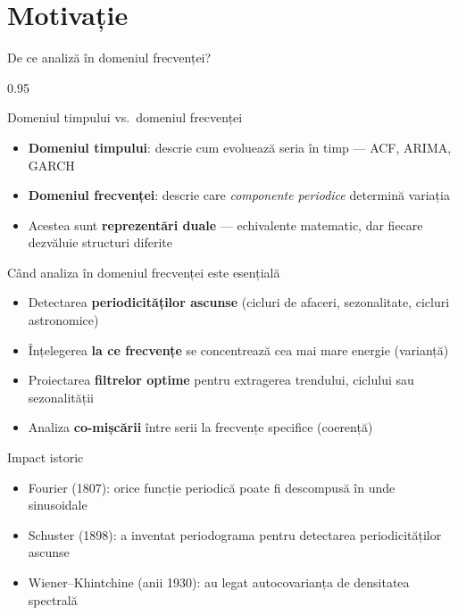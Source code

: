 \documentclass[9pt, aspectratio=169, t]{beamer}
\begin{document}
\section{Motivație}

\begin{frame}{De ce analiză în domeniul frecvenței?}
    \begin{cminipage}{0.95\textwidth}
    \vspace{-2mm}
    \begin{block}{Domeniul timpului vs.\ domeniul frecvenței}
        \begin{itemize}\setlength{\itemsep}{-2pt}
            \item \textbf{Domeniul timpului}: descrie cum evoluează seria în timp --- ACF, ARIMA, GARCH
            \item \textbf{Domeniul frecvenței}: descrie care \textit{componente periodice} determină variația
            \item Acestea sunt \textbf{reprezentări duale} --- echivalente matematic, dar fiecare dezvăluie structuri diferite
        \end{itemize}
    \end{block}
    \vspace{-2mm}
    \begin{alertblock}{Când analiza în domeniul frecvenței este esențială}
        \begin{itemize}\setlength{\itemsep}{-2pt}
            \item Detectarea \textbf{periodicităților ascunse} (cicluri de afaceri, sezonalitate, cicluri astronomice)
            \item Înțelegerea \textbf{la ce frecvențe} se concentrează cea mai mare energie (varianță)
            \item Proiectarea \textbf{filtrelor optime} pentru extragerea trendului, ciclului sau sezonalității
            \item Analiza \textbf{co-mișcării} între serii la frecvențe specifice (coerență)
        \end{itemize}
    \end{alertblock}
    \vspace{-2mm}
    \begin{exampleblock}{Impact istoric}
        \begin{itemize}\setlength{\itemsep}{-2pt}
            \item Fourier (1807): orice funcție periodică poate fi descompusă în unde sinusoidale
            \item Schuster (1898): a inventat periodograma pentru detectarea periodicităților ascunse
            \item Wiener--Khintchine (anii 1930): au legat autocovarianța de densitatea spectrală
        \end{itemize}
    \end{exampleblock}
    \end{cminipage}
\end{frame}
\end{document}

